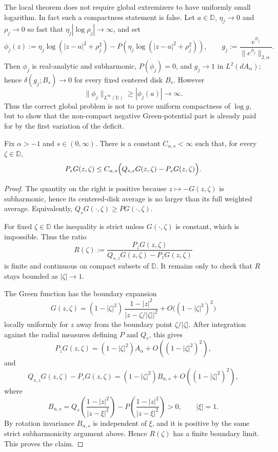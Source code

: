 \documentclass[a4paper,10pt]{amsart}
\newcommand{\D}{\mathbb{D}}
\begin{document}
The local theorem does not require global extremizers to have uniformly small
logarithm. In fact such a compactness statement is false. Let
$a\in\D$, $\eta_j\to0$ and $\rho_j\to0$ so fast that
$\eta_j|\log\rho_j|\to\infty$, and set
\[
\phi_j(z)
:=
\eta_j\log(|z-a|^2+\rho_j^2)-P\!\left(\eta_j\log(|z-a|^2+\rho_j^2)\right),
\qquad
g_j:=\frac{e^{\phi_j}}{\|e^{\phi_j}\|_{2,\alpha}}.
\]
Then $\phi_j$ is real-analytic and subharmonic, $P(\phi_j)=0$, and
$g_j\to1$ in $L^2(dA_\alpha)$; hence $\delta(g_j;B_s)\to0$ for every fixed
centered disk $B_s$. However
\[
\|\phi_j\|_{L^\infty(\D)}\ge |\phi_j(a)|\to\infty.
\]
Thus the correct global problem is not to prove uniform compactness of
$\log g$, but to show that the non-compact negative Green-potential part is
already paid for by the first variation of the deficit.

\begin{numlemma}\label{lem:green-kernel-gap}
Fix $\alpha>-1$ and $s\in(0,\infty)$. There is a constant
$C_{\alpha,s}<\infty$ such that, for every $\zeta\in\D$,
\[
P_zG(z,\zeta)
\le
C_{\alpha,s}\Bigl(Q_{s,z}G(z,\zeta)-P_zG(z,\zeta)\Bigr).
\]
\end{numlemma}

\begin{proof}
The quantity on the right is positive because $z\mapsto -G(z,\zeta)$ is
subharmonic, hence its centered-disk average is no larger than its full
weighted average. Equivalently, $Q_sG(\cdot,\zeta)\ge PG(\cdot,\zeta)$.

For fixed $\zeta\in\D$ the inequality is strict unless $G(\cdot,\zeta)$ is
constant, which is impossible. Thus the ratio
\[
R(\zeta):=
\frac{P_zG(z,\zeta)}
{Q_{s,z}G(z,\zeta)-P_zG(z,\zeta)}
\]
is finite and continuous on compact subsets of $\D$. It remains only to check
that $R$ stays bounded as $|\zeta|\to1$.

The Green function has the boundary expansion
\[
G(z,\zeta)
=(1-|\zeta|^2)\,\frac{1-|z|^2}{|z-\zeta/|\zeta||^2}
+O\bigl((1-|\zeta|^2)^2\bigr)
\]
locally uniformly for $z$ away from the boundary point $\zeta/|\zeta|$. After
integration against the radial measures defining $P$ and $Q_s$, this gives
\[
P_zG(z,\zeta)
=(1-|\zeta|^2)A_\alpha+O((1-|\zeta|^2)^2),
\]
and
\[
Q_{s,z}G(z,\zeta)-P_zG(z,\zeta)
=(1-|\zeta|^2)B_{\alpha,s}+O((1-|\zeta|^2)^2),
\]
where
\[
B_{\alpha,s}
=
Q_s\!\left(\frac{1-|z|^2}{|z-\xi|^2}\right)
-
P\!\left(\frac{1-|z|^2}{|z-\xi|^2}\right)>0,
\qquad |\xi|=1.
\]
By rotation invariance $B_{\alpha,s}$ is independent of $\xi$, and it is
positive by the same strict subharmonicity argument above. Hence
$R(\zeta)$ has a finite boundary limit. This proves the claim.
\end{proof}
\end{document}
